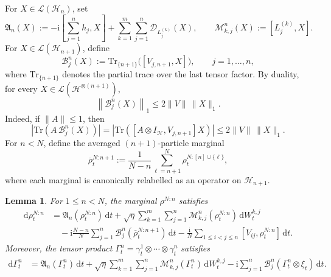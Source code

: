 \documentclass[10pt,a4paper,reqno]{amsart}
\numberwithin{equation}{section}
\theoremstyle{plain}
\newtheorem{lemma}[theorem]{Lemma}
\theoremstyle{definition}
\theoremstyle{remark}
\renewcommand{\d}{\mathrm d}
\renewcommand{\i}{\mathrm i}
\newcommand{\Tr}{\mathrm{Tr}}
\newcommand{\cL}{\mathcal L}
\newcommand{\cD}{\mathcal D}
\newcommand{\HH}{\mathcal H}
\newcommand{\1}{\mathbf 1}
\begin{document}
For \(X\in\cL(\HH_{n})\), set
\begin{equation}
 \mathfrak A_n(X):=-\i\left[\sum_{j=1}^n h_j,X\right]+\sum_{k=1}^m\sum_{j=1}^n\cD_{L_j^{(k)}}(X),
  \qquad
  \mathcal M_{k,j}^n(X):=[L_j^{(k)},X].
  \label{eq:skew-local-generator}
\end{equation}
For \(X\in\cL(\HH_{n+1})\), define
\begin{equation}
  \mathcal B_j^n(X):=\Tr_{\{n+1\}}\bigl([V_{j,n+1},X]\bigr),
  \qquad j=1,\ldots,n,
  \label{eq:skew-B-def}
\end{equation}
where \(\Tr_{\{n+1\}}\) denotes the partial trace over the last tensor factor. By duality, for every \(X\in\cL(\HH^{\otimes(n+1)})\),
\begin{equation}
  \left\|
    \mathcal B_j^n(X)
  \right\|_1
  \le
  2\|V\|\,\|X\|_1.
  \label{eq:skew-B-bound}
\end{equation}
Indeed, if \(\|A\|\le1\), then
\[
  \left|\Tr\left(A\,\mathcal B_j^n(X)\right)\right|
  =
  \left|\Tr\left([A\otimes I_{\HH},V_{j,n+1}]X\right)\right|
  \le
  2\|V\|\,\|X\|_1.
\]
For \(n<N\), define the averaged \((n+1)\)-particle marginal
\begin{equation}
  \overline\rho_t^{N:n+1}
  :=
  \frac1{N-n}
  \sum_{\ell=n+1}^N
  \rho_t^{N:[n]\cup\{\ell\}},
  \label{eq:skew-averaged-marginal}
\end{equation}
where each marginal is canonically relabelled as an operator on \(\HH_{n+1}\).

\begin{lemma}
\label{lem:skew-marginal-hierarchy}
For \(1\le n<N\), the marginal \(\rho^{N:n}\) satisfies
\begin{equation}
\begin{aligned}
  \d\rho_t^{N:n}
  &=
  \mathfrak A_n(\rho_t^{N:n})\,\d t
  +
  \sqrt{\eta}
  \sum_{k=1}^m\sum_{j=1}^n
  \mathcal M_{k,j}^n(\rho_t^{N:n})\,\d W_t^{k,j}
  \\
  &\quad
  -
  \i\frac{N-n}{N}
  \sum_{j=1}^n
  \mathcal B_j^n(\overline\rho_t^{N:n+1})\,\d t
  -
  \frac{\i}{N}
  \sum_{1\le i<j\le n}
  [V_{ij},\rho_t^{N:n}]\,\d t.
\end{aligned}
  \label{eq:skew-marginal-hierarchy}
\end{equation}
Moreover, the tensor product \(\Gamma_t^n=\gamma_t^1\otimes\cdots\otimes\gamma_t^n\) satisfies
\begin{equation}
\begin{aligned}
  \d\Gamma_t^n
  &=
 \mathfrak A_n(\Gamma_t^n)\,\d t
  +
  \sqrt{\eta}
  \sum_{k=1}^m\sum_{j=1}^n
  \mathcal M_{k,j}^n(\Gamma_t^n)\,\d W_t^{k,j}
  -
  \i
  \sum_{j=1}^n
  \mathcal B_j^n(\Gamma_t^n\otimes\xi_t)\,\d t.
\end{aligned}
  \label{eq:skew-limit-hierarchy}
\end{equation}
\end{lemma}
\end{document}
